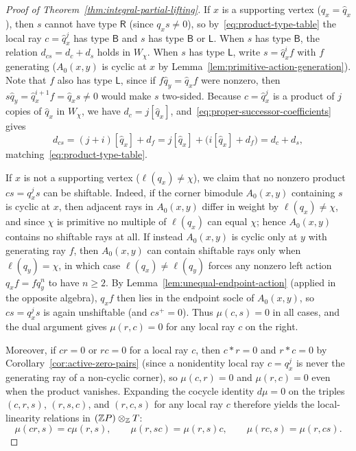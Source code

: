 \begin{proof}[Proof of Theorem~\ref{thm:integral-partial-lifting}]
If $x$ is a supporting vertex ($q_x=\widehat q_x$), then $s$ cannot have type $\mathsf R$ (since $q_xs\ne0$), so by~\eqref{eq:product-type-table} the local ray $c=\widehat q_x^j$ has type $\mathsf B$ and $s$ has type $\mathsf B$ or $\mathsf L$. When $s$ has type $\mathsf B$, the relation $d_{cs}=d_c+d_s$ holds in $W_\chi$. When $s$ has type $\mathsf L$, write $s=\widehat q_x^if$ with $f$ generating ($A_0(x,y)$ is cyclic at $x$ by Lemma~\ref{lem:primitive-action-generation}). Note that $f$ also has type $\mathsf L$, since if $f\widehat q_y=\widehat q_xf$ were nonzero, then $s\widehat q_y=\widehat q_x^{i+1}f=\widehat q_xs\ne0$ would make $s$ two-sided. Because $c=\widehat q_x^j$ is a product of $j$ copies of $\widehat q_x$ in $W_\chi$, we have $d_c=j[\widehat q_x]$, and~\eqref{eq:proper-successor-coefficients} gives
\[
  d_{cs}=(j+i)[\widehat q_x]+d_f=j[\widehat q_x]+\bigl(i[\widehat q_x]+d_f\bigr)=d_c+d_s,
\]
matching~\eqref{eq:product-type-table}.

If $x$ is not a supporting vertex ($\ell(q_x)\ne\chi$), we claim that no nonzero product $cs=q_x^js$ can be shiftable. Indeed, if the corner bimodule $A_0(x,y)$ containing $s$ is cyclic at $x$, then adjacent rays in $A_0(x,y)$ differ in weight by $\ell(q_x)\ne\chi$, and since $\chi$ is primitive no multiple of $\ell(q_x)$ can equal $\chi$; hence $A_0(x,y)$ contains no shiftable rays at all. If instead $A_0(x,y)$ is cyclic only at $y$ with generating ray $f$, then $A_0(x,y)$ can contain shiftable rays only when $\ell(q_y)=\chi$, in which case $\ell(q_x)\ne\ell(q_y)$ forces any nonzero left action $q_xf=fq_y^n$ to have $n\geq2$. By Lemma~\ref{lem:unequal-endpoint-action} (applied in the opposite algebra), $q_xf$ then lies in the endpoint socle of $A_0(x,y)$, so $cs=q_x^js$ is again unshiftable (and $cs^+=0$). Thus $\mu(c,s)=0$ in all cases, and the dual argument gives $\mu(r,c)=0$ for any local ray $c$ on the right.

Moreover, if $cr=0$ or $rc=0$ for a local ray $c$, then $c*r=0$ and $r*c=0$ by Corollary~\ref{cor:active-zero-pairs} (since a nonidentity local ray $c=q_x^j$ is never the generating ray of a non-cyclic corner), so $\mu(c,r)=0$ and $\mu(r,c)=0$ even when the product vanishes. Expanding the cocycle identity $d\mu=0$ on the triples $(c,r,s)$, $(r,s,c)$, and $(r,c,s)$ for any local ray $c$ therefore yields the local-linearity relations in $(\mathbb Z P)\otimes_\mathbb Z T$:
\begin{equation}
  \mu(cr,s)=c\mu(r,s),\qquad
  \mu(r,sc)=\mu(r,s)c,\qquad
  \mu(rc,s)=\mu(r,cs).
  \label{eq:local-ring-relativity}
\end{equation}


\end{proof}
